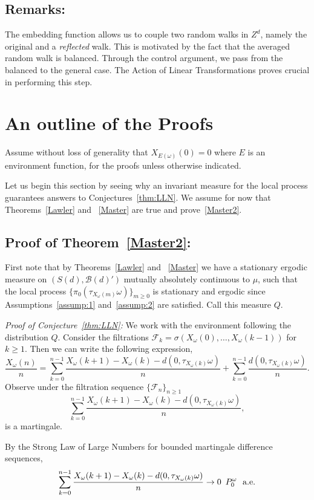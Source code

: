 \documentclass[final]{aomart}
\def\mathscr#1{#1}%
\def\mathbb#1{#1}%
\theoremstyle{plain}
\theoremstyle{definition}
\theoremstyle{remark}
\begin{document}
\subsection{Remarks:} 
The embedding function allows us to couple two random walks in $\mathbb{Z}^d$, namely the original and a \textit{reflected} walk. This is motivated by the fact that the averaged random walk is balanced. Through the control argument, we pass from the balanced to the general case. The Action of Linear Transformations proves crucial in performing this step. 
\section{An outline of the Proofs }
Assume without loss of generality that $X_{\mathscr{E}(\omega)}(0)=0$ where $\mathscr{E}$ is an environment function, for the proofs unless otherwise indicated. 

Let us begin this section by seeing why an invariant measure for the local process guarantees answers to Conjectures~\ref{thm:LLN}.  We assume for now that Theorems~\ref{Lawler} and ~\ref{Master} are true and prove~\ref{Master2}.
\subsection{Proof of Theorem~\ref{Master2}:}
First note that by Theorems~\ref{Lawler} and ~\ref{Master} we have a stationary ergodic measure on $(\mathscr{S}(d), \mathcal{B}(d)')$ mutually absolutely continuous to $\mu$, such that the local process $\{\pi_0(\tau_{X_\omega(m)}\omega)\}_{m\geq0}$ is stationary and ergodic since Assumptions~\ref{assump:1} and~\ref{assump:2} are satisfied. Call this measure $\mathbb{Q}$.

\textit{Proof of Conjecture~\ref{thm:LLN}:}
We work with the environment following the distribution $\mathbb{Q}$. Consider the filtrations  $\mathcal{F}_k=\sigma(X_\omega(0),\dots, X_\omega({k-1}))$ for $k\geq1 $. Then we can write the following expression,
 \[
    \frac{X_{\omega}(n)}{n } = \sum_{k=0}^{n-1} \frac{X_{\omega}(k+1)-X_{\omega}(k) - d(0,\tau_{X_\omega(k)}\omega)}{n} + \sum_{k=0}^{n-1}\frac{d(0,\tau_{X_\omega(k)}\omega)}{n}.
     \]
Observe under the filtration sequence $\{\mathcal{F}_n\}_{n\geq 1}$ \[
\sum_{k=0}^{n-1} \frac{X_{\omega}(k+1)-X_{\omega}(k) - d(0,\tau_{X_\omega(k)}\omega)}{n},
\]
is a martingale. 

By the Strong Law of Large Numbers for bounded martingale difference sequences, 
\[ 
\sum_{k=0}^{n-1} \frac{X_{\omega}(k+1)-X_{\omega}(k) - d(0,\tau_{X_\omega(k)}\omega)}{n} \to 0 \hspace{0.5em} \mathbb{P}_0^\omega \ \ \text{a.e.} 
\]
\end{document}
